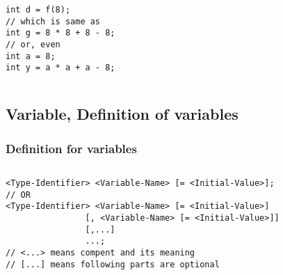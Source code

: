 \documentclass[en, 11pt, xcolor=dvipsnames]{beamer}
\begin{document}
\begin{frame}[fragile]
\begin{columns}[c]
\begin{column}{0.9\textwidth}
\begin{columns}[c]
\begin{column}{0.5\textwidth}
					\begin{lstlisting}[style=Java]
int d = f(8);
// which is same as
int g = 8 * 8 + 8 - 8;
// or, even
int a = 8;
int y = a * a + a - 8;\end{lstlisting}
				\end{column}
			\end{columns}

		\end{column}
	\end{columns}

\end{frame}

\subsection{Variable, Definition of variables}
\begin{frame}[fragile]
	\frametitle{Definition for variables}


	\begin{columns}[c]
		\begin{column}{0.9\textwidth}

			\begin{lstlisting}
<Type-Identifier> <Variable-Name> [= <Initial-Value>];
// OR
<Type-Identifier> <Variable-Name> [= <Initial-Value>]
                [, <Variable-Name> [= <Initial-Value>]]
                [,...]
                ...;
// <...> means compent and its meaning
// [...] means following parts are optional\end{lstlisting}


\end{column}
\end{columns}
\end{frame}
\end{document}
